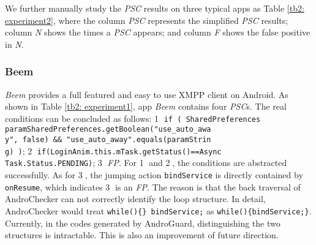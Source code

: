 We further manually study the \textit{PSC} results on three typical apps as Table \ref{tb2: experiment2}, where the column \textit{PSC} represents the simplified \textit{PSC} results; column \textit{N} shows the times a \textit{PSC} appears;  
and column \textit{F} shows the false positive in \textit{N}. 

\subsubsection{Beem}
\textit{Beem} provides a full featured and easy to use XMPP client on Android. As shown in Table \ref{tb2: experiment1}, app \textit{Beem} contains four \textit{PSC}s.
The real conditions can be concluded as follows: \textcircled{1} \texttt{if ( SharedPreferences paramSharedPreferences.getBoolean("use\_auto\_awa}  \\
\texttt{y", false) \&\& "use\_auto\_away".equals(paramStrin}\\
\texttt{g) )}; \textcircled{2} \texttt{if(LoginAnim.this.mTask.getStatus()==Async}\\
\texttt{Task.Status.PENDING)}; \textcircled{3} \textit{FP}. For  \textcircled{1} and \textcircled{2}, the conditions are abstracted successfully. As for \textcircled{3}, the jumping action \texttt{bindService} is directly contained by \texttt{onResume}, which indicates \textcircled{3} is an \textit{FP}. The reason is that the back traversal of AndroChecker can not correctly identify the loop structure. In detail, AndroChecker would treat \texttt{while()\{\} bindService;} as \texttt{while()\{bindService;\}}. Currently, in the codes generated by AndroGuard, distinguishing the two structures is intractable. This is also an improvement of future direction.

